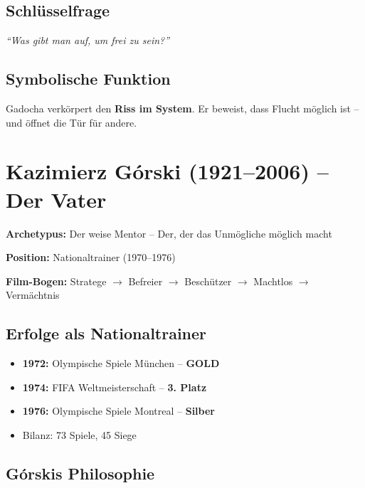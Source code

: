 \documentclass[11pt,a4paper]{book}
\newenvironment{filminfo}{%
  \begin{mdframed}[
    linecolor=darkgray,
    linewidth=1pt,
    backgroundcolor=gray!5,
    innertopmargin=10pt,
    innerbottommargin=10pt
  ]
}{%
  \end{mdframed}
}
\newenvironment{kontextbox}{%
  \begin{mdframed}[
    linecolor=polishred,
    linewidth=1pt,
    backgroundcolor=white,
    leftmargin=20pt,
    rightmargin=20pt
  ]
}{%
  \end{mdframed}
}
\begin{document}
\subsection{Schlüsselfrage}

\begin{kontextbox}
\textit{``Was gibt man auf, um frei zu sein?''}
\end{kontextbox}

\subsection{Symbolische Funktion}

Gadocha verkörpert den \textbf{Riss im System}. Er beweist, dass Flucht möglich ist -- und öffnet die Tür für andere.


\section{Kazimierz Górski (1921--2006) -- Der Vater}

\begin{filminfo}
\textbf{Archetypus:} Der weise Mentor -- Der, der das Unmögliche möglich macht

\textbf{Position:} Nationaltrainer (1970--1976)

\textbf{Film-Bogen:} Stratege $\rightarrow$ Befreier $\rightarrow$ Beschützer $\rightarrow$ Machtlos $\rightarrow$ Vermächtnis
\end{filminfo}

\subsection{Erfolge als Nationaltrainer}

\begin{itemize}
    \item \textbf{1972:} Olympische Spiele München -- \textbf{GOLD}
    \item \textbf{1974:} FIFA Weltmeisterschaft -- \textbf{3. Platz}
    \item \textbf{1976:} Olympische Spiele Montreal -- \textbf{Silber}
    \item Bilanz: 73 Spiele, 45 Siege
\end{itemize}

\subsection{Górskis Philosophie}
\end{document}
